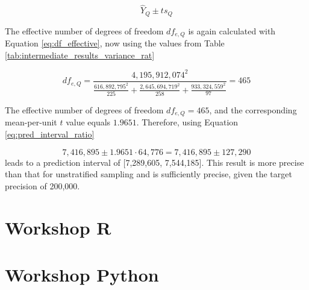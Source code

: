 \begin{equation}
\hat{Y}_Q \pm t s_Q 
\label{eq:pred_interval_strat_rat}
\end{equation}

The effective number of degrees of freedom $df_{e, Q}$ is again calculated with Equation \ref{eq:df_effective}, now using the values from Table \ref{tab:intermediate_results_variance_rat}

\begin{equation*}
df_{e, Q} = \frac{4,195,912,074^2}{\frac{616,892,795^2}{225} + \frac{2,645,694,719^2}{258} + \frac{933,324,559^2}{97}} = 465
\end{equation*}

The effective number of degrees of freedom $df_{e, Q} = 465$, and the corresponding mean-per-unit $t$ value equals $1.9651$. Therefore, using Equation \ref{eq:pred_interval_ratio} 

\begin{equation*}
7,416,895 \pm 1.9651 \cdot 64,776 = 7,416,895 \pm 127,290
\end{equation*}
leads to a prediction interval of [7,289,605,\hspace{0.5em} 7,544,185]. This result is more precise than that for unstratified sampling and is sufficiently precise, given the target precision of 200,000.


\section{Workshop R} %
\label{sec:workshop04}




\section{Workshop Python} %
\label{sec:workshop04_python}




